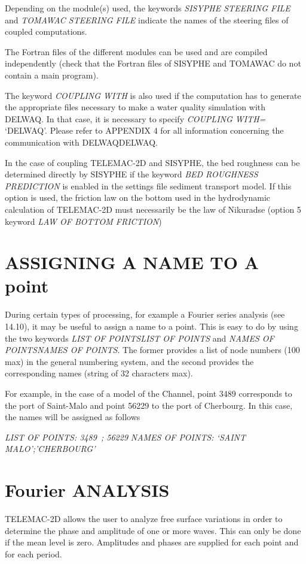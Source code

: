  Depending on the module(s) used, the keywords \textit{SISYPHE STEERING FILE }and\textit{ TOMAWAC STEERING FILE} indicate the names of the steering files of coupled computations.

 The Fortran files of the different modules can be used and are compiled independently (check that the Fortran files of SISYPHE and TOMAWAC do not contain a main program).

 The keyword \textit{COUPLING WITH} is also used if the computation has to generate the appropriate files necessary to make a water quality simulation with DELWAQ. In that case, it is necessary to specify \textit{COUPLING WITH= }`DELWAQ'. Please refer to APPENDIX 4 for all information concerning the communication with DELWAQDELWAQ.

 In the case of coupling TELEMAC-2D and SISYPHE, the bed roughness can be determined directly by SISYPHE if the keyword \textit{BED ROUGHNESS PREDICTION }is enabled in the settings file sediment transport model. If this option is used, the friction law on the bottom used in the hydrodynamic calculation of TELEMAC-2D must necessarily be the law of Nikuradse (option 5 keyword \textit{LAW OF BOTTOM FRICTION})


\section{ ASSIGNING A NAME TO A point}

 During certain types of processing, for example a Fourier series analysis (see 14.10), it may be useful to assign a name to a point. This is easy to do by using the two keywords \textit{LIST OF POINTSLIST OF POINTS} and \textit{NAMES OF POINTSNAMES OF POINTS}. The former provides a list of node numbers (100 max) in the general numbering system, and the second provides the corresponding names (string of 32 characters max).

 For example, in the case of a model of the Channel, point 3489 corresponds to the port of Saint-Malo and point 56229 to the port of Cherbourg. In this case, the names will be assigned as follows

 \textit{LIST OF POINTS: 3489~; 56229}
 \textit{NAMES OF POINTS: `SAINT MALO';'CHERBOURG'}


\section{ Fourier ANALYSIS}

 TELEMAC-2D allows the user to analyze free surface variations in order to determine the phase and amplitude of one or more waves. This can only be done if the mean level is zero. Amplitudes and phases are supplied for each point and for each period.

